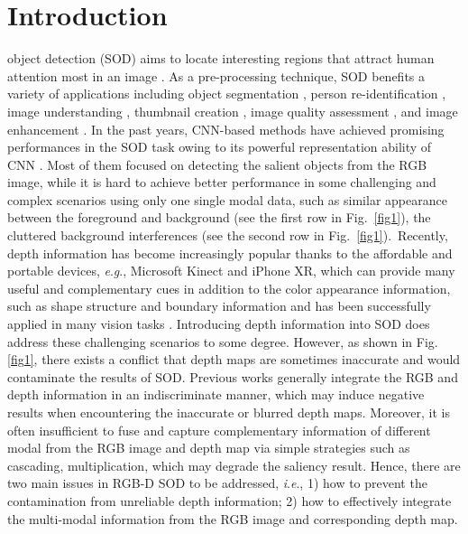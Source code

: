 \documentclass[journal]{IEEEtran}
\newcommand{\ie}{\textit{i}.\textit{e}.}
\newcommand{\eg}{\textit{e}.\textit{g}.}
\begin{document}
\section{Introduction} \label{sec1}
 object detection (SOD) aims to locate interesting regions that attract human attention most in an image \cite{Survey, REVIEW}. As a pre-processing technique, SOD benefits a variety of applications including object segmentation \cite{R1}, person re-identification \cite{zhao2013unsupervised}, image understanding \cite{zhang2014saliency}, thumbnail creation \cite{R2}, image quality assessment \cite{R3}, and image enhancement \cite{R4}. In the past years, CNN-based methods have achieved promising performances in the SOD task owing to its powerful representation ability of CNN \cite{krizhevsky2012imagenet}. Most of them \cite{DSS,deng2018r3net,liu2018picanet,Liu2019PoolSal,Qin_2019_CVPR,zhao2019EGNet,feng2019attentive,PFANet,GCPANet,Unsupervised,weaksupervised,wang2013saliency,wang2018detecting,nips20} focused on detecting the salient objects from the RGB image, while it is hard to achieve better performance in some challenging and complex scenarios using only one single modal data, such as similar appearance between the foreground and background (see the first row in Fig.\ \ref{fig1}), the cluttered background interferences (see the second row in Fig.\ \ref{fig1}).\ Recently, depth information has become increasingly popular thanks to the affordable and portable devices, \eg, Microsoft Kinect and iPhone XR, which can provide many useful and complementary cues in addition to the color appearance information, such as shape structure and boundary information and has been successfully applied in many vision tasks \cite{crmspl,choi13iros_rgbdtracking,crmtip18,crmtc19,ijcai20,crmtmm19,crmtc20,lcy2020tc,eccv20}. Introducing depth information into SOD does address these challenging scenarios to some degree. However, as shown in Fig. \ref{fig1}, there exists a conflict that depth maps are sometimes inaccurate and would contaminate the results of SOD. Previous works generally integrate the RGB and depth information in an indiscriminate manner, which may induce negative results when encountering the inaccurate or blurred depth maps. Moreover, it is often insufficient  to fuse and capture complementary information of different modal from the RGB image and depth map via simple strategies such as cascading, multiplication, which may degrade the saliency result.
Hence, there are two main issues in RGB-D SOD to be addressed, \ie, 1) how to prevent the contamination from unreliable depth information; 2) how to effectively integrate the multi-modal information from the RGB image and corresponding depth map.
\end{document}
